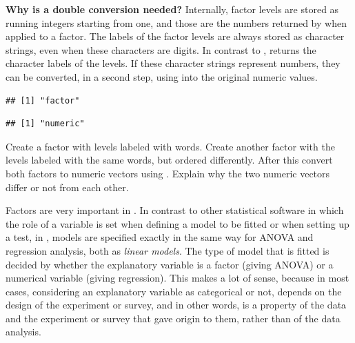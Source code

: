 \documentclass[krantz2]{krantz}\usepackage{knitr}
\begin{document}
\begin{explainbox}
\textbf{Why is a double conversion needed?} Internally, factor levels are stored as running integers starting from one, and those are the numbers returned by  when applied to a factor. The labels of the factor levels are always stored as character strings, even when these characters are digits. In contrast to ,  returns the character labels of the levels. If these character strings represent numbers, they can be converted, in a second step, using  into the original numeric values.

\begin{knitrout}\footnotesize
{}\color{fgcolor}\begin{kframe}
\begin{alltt}
\end{alltt}
\begin{verbatim}
## [1] "factor"
\end{verbatim}
\begin{alltt}
\end{alltt}
\begin{verbatim}
## [1] "numeric"
\end{verbatim}
\end{kframe}
\end{knitrout}
\end{explainbox}

\begin{playground}
Create a factor with levels labeled with words. Create another factor with the levels labeled with the same words, but ordered differently. After this convert both factors to numeric vectors using . Explain why the two numeric vectors differ or not from each other.
\end{playground}

Factors are very important in \Rlang. In contrast to other statistical software in which the role of a variable is set when defining a model to be fitted or when setting up a test, in \Rlang, models are specified exactly in the same way for ANOVA and regression analysis, both as \emph{linear models}. The type of model that is fitted is decided by whether the explanatory variable is a factor (giving ANOVA) or a numerical variable (giving regression). This makes a lot of sense, because in most cases, considering an explanatory variable as categorical or not, depends on the design of the experiment or survey, and in other words, is a property of the data and the experiment or survey that gave origin to them, rather than of the data analysis.
\end{document}
